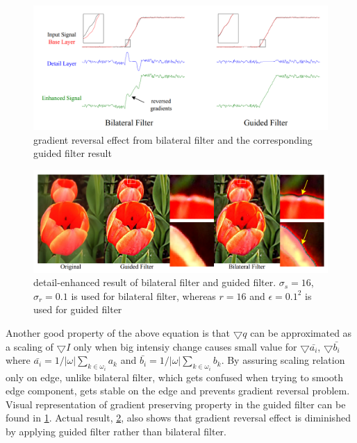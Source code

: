 \documentclass[extendedabs]{bmvc2k}
\begin{document}
\begin{figure}[h]
    \centering
    \includegraphics[width=\linewidth]{hw2_1_1}
    \caption{gradient reversal effect from bilateral filter and the corresponding guided filter result}
    \label{fig:1}
\end{figure}

\begin{figure}[h]
    \centering
    \includegraphics[width=\linewidth]{hw2_1_4}
    \caption{detail-enhanced result of bilateral filter and guided filter.
    $\sigma_s=16$, $\sigma_r=0.1$ is used for bilateral filter, whereas 
    $r=16$ and $\epsilon=0.1^2$ is used for guided filter}
    \label{fig:4}
\end{figure}

Another good property of the above equation is that $\bigtriangledown q$ can be approximated
as a scaling of $\bigtriangledown I$ only when big intensiy change causes small value for
$\bigtriangledown \bar{a_i}$, $\bigtriangledown \bar{b_i}$ where
$\bar{a_i} = 1/|\omega|\sum_{k \in \omega_i}a_k$ and 
$\bar{b_i} = 1/|\omega|\sum_{k \in \omega_i}b_k$. By assuring scaling relation only on edge,
unlike bilateral filter, which gets confused when trying to smooth edge component, gets stable on
the edge and prevents gradient reversal problem.  
Visual representation of gradient preserving property in the guided filter can 
be found in \figurename{\ref{fig:1}}.
Actual result, \figurename{\ref{fig:4}}, also shows that gradient reversal effect is diminished by 
applying guided filter rather than bilateral filter.
\end{document}
